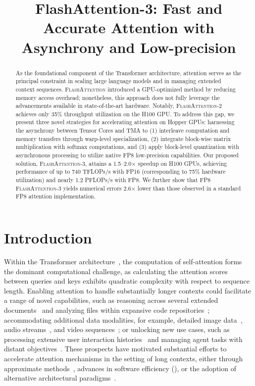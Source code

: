 \title{FlashAttention-3: Fast and Accurate Attention with Asynchrony and Low-precision}

\begin{abstract}
As the foundational component of the Transformer architecture, attention serves as the principal constraint in scaling large language models and in managing extended context sequences. \textsc{FlashAttention} introduced a GPU-optimized method by reducing memory access overhead; nonetheless, this approach does not fully leverage the advancements available in state-of-the-art hardware. Notably, \textsc{FlashAttention-2} achieves only 35\% throughput utilization on the H100 GPU. To address this gap, we present three novel strategies for accelerating attention on Hopper GPUs: harnessing the asynchrony between Tensor Cores and TMA to (1) interleave computation and memory transfers through warp-level specialization, (2) integrate block-wise matrix multiplication with softmax computations, and (3) apply block-level quantization with asynchronous processing to utilize native FP8 low-precision capabilities. Our proposed solution, \textsc{FlashAttention-3}, attains a 1.5–2.0$\times$ speedup on H100 GPUs, achieving performance of up to 740 TFLOPs/s with FP16 (corresponding to 75\% hardware utilization) and nearly 1.2 PFLOPs/s with FP8. We further show that FP8 \textsc{FlashAttention-3} yields numerical errors 2.6$\times$ lower than those observed in a standard FP8 attention implementation.
\end{abstract}

\section{Introduction}
\label{sec:intro}

Within the Transformer architecture~\citep{vaswani2017attention}, the computation of self-attention forms the dominant computational challenge, as calculating the attention scores between queries and keys exhibits quadratic complexity with respect to sequence length. Enabling attention to handle substantially longer contexts could facilitate a range of novel capabilities, such as reasoning across several extended documents~\citep{guo2021longt5,shaham2022scrolls,peng2023yarn} and analyzing files within expansive code repositories~\citep{roziere2023code, li2023starcoder}; accommodating additional data modalities, for example, detailed image data~\citep{chen2022scaling}, audio streams~\citep{gulati2020conformer}, and video sequences~\citep{ho2022video}; or unlocking new use cases, such as processing extensive user interaction histories~\citep{sun2019bert4rec} and managing agent tasks with distant objectives~\citep{yao2022react}. These prospects have motivated substantial efforts to accelerate attention mechanisms in the setting of long contexts, either through approximate methods~\citep{katharopoulos2020transformers,choromanski2020rethinking,
tay2020efficient}, advances in software efficiency (\citep{rabe2021self,dao2022flashattention,kwon2023efficient}), or the adoption of alternative architectural paradigms~\citep{peng2023rwkv,sun2023retentive,gu2023mamba}.

